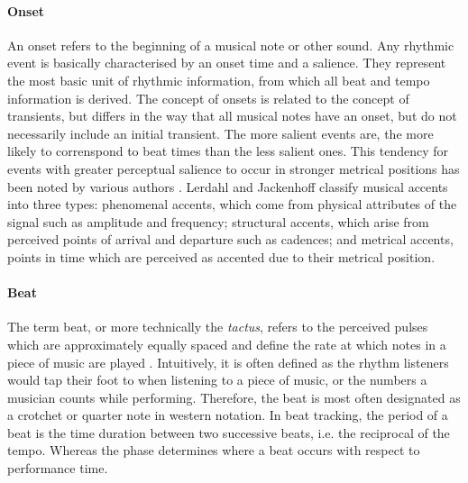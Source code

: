 \documentclass{scrartcl}
\begin{document}
\paragraph{Onset} 
An onset refers to the beginning of a musical note or other sound. Any rhythmic event is basically characterised by an onset time and a salience. They represent the most basic unit of rhythmic information, from which all beat and tempo information is derived. The concept of onsets is related to the concept of transients, but differs in the way that all musical notes have an onset, but do not necessarily include an initial transient. The more salient events are, the more likely to correnspond to beat times than the less salient ones. This tendency for events with greater perceptual salience to occur in stronger metrical positions has been noted by various authors \cite{Lerdahl1985,Povel1985,Parncutt1994}. Lerdahl and Jackenhoff \cite{Lerdahl1985} classify musical accents into three types: phenomenal accents, which come from physical attributes of the signal such as amplitude and frequency; structural accents, which arise from perceived points of arrival and departure such as cadences; and metrical accents, points in time which are perceived as accented due to their metrical position.


\paragraph{Beat} 
The term beat, or more technically the \emph{tactus}, refers to the perceived pulses which are approximately equally spaced and define the rate at which notes in a piece of music are played \cite{Handel1989}. Intuitively, it is often defined as the rhythm listeners would tap their foot to when listening to a piece of music, or the numbers a musician counts while performing. Therefore, the beat is most often designated as a crotchet or quarter note in western notation. In beat tracking, the period of a beat is the time duration between two successive beats, i.e. the reciprocal of the tempo. Whereas the phase determines where a beat occurs with respect to performance time.
\end{document}

